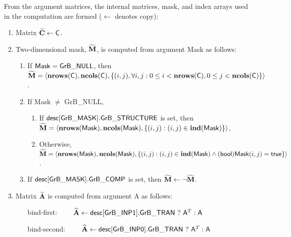 From the argument matrices, the internal matrices, mask, and index arrays used in 
the computation are formed ($\leftarrow$ denotes copy):
\begin{enumerate}
	\item Matrix ${\bf \widetilde{C}} \leftarrow {\sf C}$.

	\item Two-dimensional mask, ${\bf \widetilde{M}}$, is computed from 
    argument {\sf Mask} as follows:
	\begin{enumerate}
		\item If ${\sf Mask} = {\sf GrB\_NULL}$, then ${\bf \widetilde{M}} = 
        \langle \bold{nrows}({\sf C}), \bold{ncols}({\sf C}), \{(i,j), 
        \forall i,j : 0 \leq i <  \bold{nrows}({\sf C}), 0 \leq j < 
        \bold{ncols}({\sf C}) \} \rangle$.

		\item If {\sf Mask} $\ne$ {\sf GrB\_NULL},
        \begin{enumerate}
            \item If ${\sf desc[GrB\_MASK].GrB\_STRUCTURE}$ is set, then 
            ${\bf \widetilde{M}} = \langle \bold{nrows}({\sf Mask}), 
            \bold{ncols}({\sf Mask}), \{(i,j) : (i,j) \in \bold{ind}({\sf Mask}) \} \rangle$,
            \item Otherwise, ${\bf \widetilde{M}} = \langle \bold{nrows}({\sf Mask}), 
            \bold{ncols}({\sf Mask}), \\ \{(i,j) : (i,j) \in \bold{ind}({\sf Mask}) \wedge 
            ({\sf bool}){\sf Mask}(i,j) = {\sf true}\} \rangle$.
        \end{enumerate}

		\item	If ${\sf desc[GrB\_MASK].GrB\_COMP}$ is set, then 
        ${\bf \widetilde{M}} \leftarrow \neg {\bf \widetilde{M}}$.
	\end{enumerate}

	\item Matrix ${\bf \widetilde{A}}$ is computed from argument {\sf A} as 
    follows: 
    \begin{itemize}[leftmargin=1.2in]
    \item[bind-first:~~~~]  ${\bf \widetilde{A}}\leftarrow
        {\sf desc[GrB\_INP1].GrB\_TRAN} \ ? \ {\sf A}^T : {\sf A}$
    \item[bind-second:~~~~] ${\bf \widetilde{A}}\leftarrow
        {\sf desc[GrB\_INP0].GrB\_TRAN} \ ? \ {\sf A}^T : {\sf A}$
    \end{itemize}
\end{enumerate}


